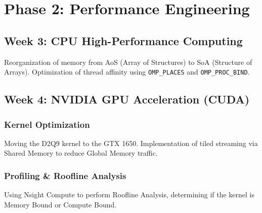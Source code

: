 \chapter{Phase 2: Performance Engineering}

\section{Week 3: CPU High-Performance Computing}
Reorganization of memory from AoS (Array of Structures) to SoA (Structure of Arrays). Optimization of thread affinity using \texttt{OMP\_PLACES} and \texttt{OMP\_PROC\_BIND}.

\section{Week 4: NVIDIA GPU Acceleration (CUDA)}
\subsection{Kernel Optimization}
Moving the D2Q9 kernel to the GTX 1650. Implementation of tiled streaming via Shared Memory to reduce Global Memory traffic.

\subsection{Profiling \& Roofline Analysis}
Using Nsight Compute to perform Roofline Analysis, determining if the kernel is Memory Bound or Compute Bound.
